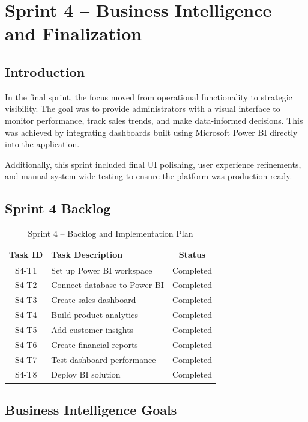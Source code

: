 \chapter{Sprint 4 – Business Intelligence and Finalization}

\section{Introduction}

In the final sprint, the focus moved from operational functionality to strategic visibility. The goal was to provide administrators with a visual interface to monitor performance, track sales trends, and make data-informed decisions. This was achieved by integrating dashboards built using Microsoft Power BI directly into the application.

Additionally, this sprint included final UI polishing, user experience refinements, and manual system-wide testing to ensure the platform was production-ready.

\section{Sprint 4 Backlog}

\begin{table}[H]
\centering
\begin{tabular}{|c|p{10cm}|c|}
\hline
\textbf{Task ID} & \textbf{Task Description} & \textbf{Status} \\
\hline
S4-T1 & Set up Power BI workspace & Completed \\
S4-T2 & Connect database to Power BI & Completed \\
S4-T3 & Create sales dashboard & Completed \\
S4-T4 & Build product analytics & Completed \\
S4-T5 & Add customer insights & Completed \\
S4-T6 & Create financial reports & Completed \\
S4-T7 & Test dashboard performance & Completed \\
S4-T8 & Deploy BI solution & Completed \\
\hline
\end{tabular}
\caption{Sprint 4 – Backlog and Implementation Plan}
\label{tab:sprint4-backlog}
\end{table}

\section{Business Intelligence Goals}

